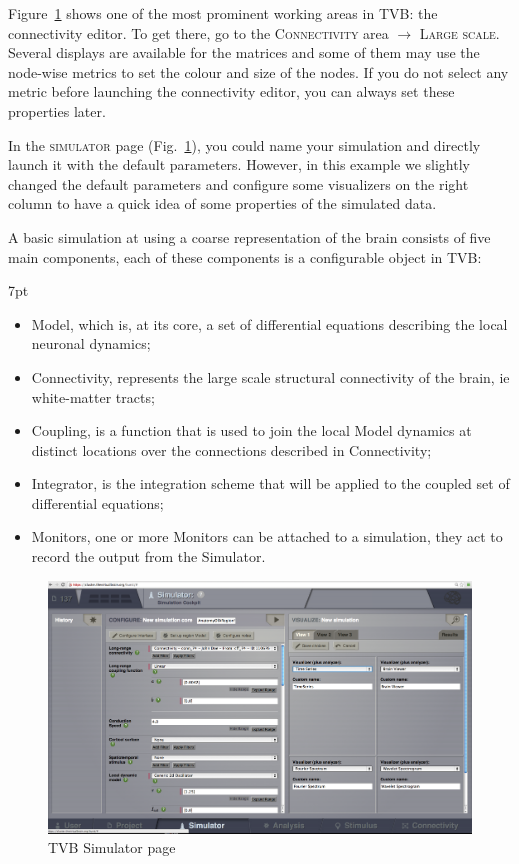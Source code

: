 \documentclass{tufte-handout}
\newenvironment{simulation}{%
  \def\FrameCommand{%
    \hspace{1pt}%
    {\color{ForestGreen}\vrule width 2pt}%
    {\color{simulationshade}\vrule width 4pt}%
    \colorbox{simulationshade}%
  }%
  \MakeFramed{\advance\hsize-\width\FrameRestore}%
  \noindent\hspace{-4.55pt}%
  \begin{adjustwidth}{}{7pt}%
  \vspace{2pt}\vspace{2pt}%
}
{%
  \vspace{2pt}\end{adjustwidth}\endMakeFramed%
}
\begin{document}
Figure~\ref{fig:fig} shows one of the most prominent working areas in
\textsc{TVB}: the connectivity editor. To get there, go to the
\textsc{Connectivity} area $\rightarrow$ \textsc{Large scale}. Several
displays are available for the matrices and some of them may use the node-wise
metrics to set the colour and size of the nodes. If you do not select any
metric before launching the connectivity editor, you can always set these
properties later.


In the \textsc{simulator} page (Fig.~\ref{fig:fig}), you could name your
simulation and directly launch it with the default parameters. However, in
this example we slightly changed the default parameters and configure some
visualizers on the right column to have a quick idea of some properties of the
simulated data.

A basic simulation at using a coarse representation of the brain consists of
five main components, each of these components is a configurable object in
TVB:

\begin{simulation}
\begin{itemize}
\item Model, which is, at its core, a set of differential equations describing the local neuronal dynamics;
\item Connectivity, represents the large scale structural connectivity of the brain, ie white-matter tracts;
\item Coupling, is a function that is used to join the local Model dynamics at distinct locations over the connections described in Connectivity;
\item Integrator, is the integration scheme that will be applied to the coupled set of differential equations;
\item Monitors, one or more Monitors can be attached to a simulation, they act to record the output from the Simulator.
\end{itemize}
\end{simulation}

\begin{figure}[h]
  \includegraphics[width=\linewidth]{Handout_UI_BuildingYourOwnBrainNetworkModel_SimulatorArea}%
  \caption{TVB Simulator page}%
  \label{fig:fig}%
\end{figure}
\end{document}
